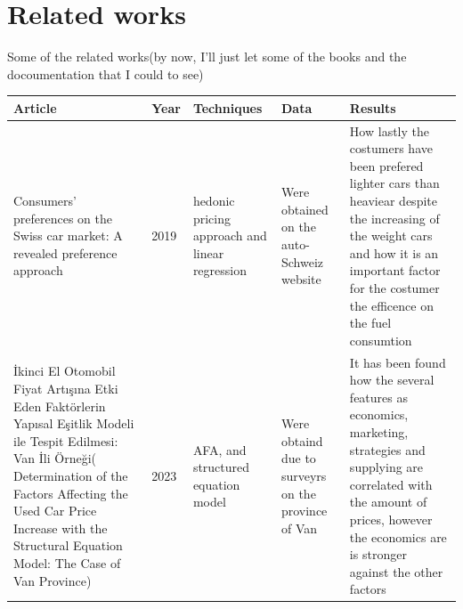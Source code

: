 \documentclass{article}
\begin{document}
\section{Related works}
Some of the related works(by now, I'll just let some of the books and the docoumentation that I could  to see)
\begin{center}
  \begin{tabular}{|m{2.5cm}|m{2.5cm}|m{2.5cm}|m{2.5cm}|m{2.5cm}|}
    \hline
    Article & Year & Techniques & Data & Results \\ \hline
    Consumers' preferences on the Swiss car market: A revealed preference approach& 2019&hedonic pricing approach and linear regression& Were obtained on the auto-Schweiz website&How lastly the costumers have been prefered lighter cars than heaviear despite the increasing of the weight cars and how it is an important factor for the costumer the efficence on the fuel consumtion\\
    \hline
    İkinci El Otomobil Fiyat Artışına Etki Eden Faktörlerin Yapısal Eşitlik Modeli ile Tespit Edilmesi: Van İli Örneği( Determination of the Factors Affecting the Used Car Price Increase with the Structural Equation Model: The Case of Van Province) & 2023 & AFA, and structured equation model& Were obtaind due to surveyrs on the province of Van & It has been found how the several features as economics, marketing, strategies and supplying are correlated with the amount of prices, however the economics are is stronger against the other factors\\
    \hline
  \end{tabular}
\end{center}
\end{document}
